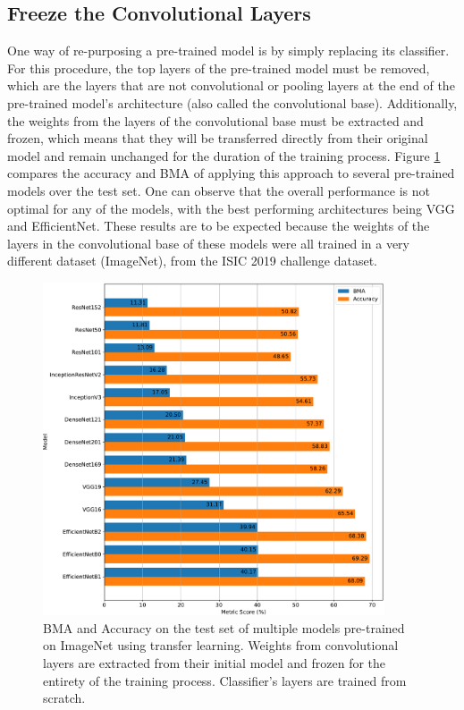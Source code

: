     \subsection{Freeze the Convolutional Layers}
    One way of re-purposing a pre-trained model is by simply replacing its classifier. For this procedure, the top layers of the pre-trained model must be removed, which are the layers that are not convolutional or pooling layers at the end of the pre-trained model's architecture (also called the convolutional base). Additionally, the weights from the layers of the convolutional base must be extracted and frozen, which means that they will be transferred directly from their original model and remain unchanged for the duration of the training process. Figure \ref{fig:pre_trained_models_classifier_comp} compares the accuracy and \ac{BMA} of applying this approach to several pre-trained models over the test set. One can observe that the overall performance is not optimal for any of the models, with the best performing architectures being VGG and EfficientNet. These results are to be expected because the weights of the layers in the convolutional base of these models were all trained in a very different dataset (ImageNet), from the \ac{ISIC} 2019 challenge dataset. \par
    \begin{figure}[ht]
        \centering
        \includegraphics[width=0.9\textwidth]{figs/pre_trained_models_classifier_comp_horizontal.pdf}
        \caption[Comparison of pre-trained models with frozen convolutional base]{\ac{BMA} and Accuracy on the test set of multiple models pre-trained on ImageNet using transfer learning. Weights from convolutional layers are extracted from their initial model and frozen for the entirety of the training process. Classifier's layers are trained from scratch.}
        \label{fig:pre_trained_models_classifier_comp}
    \end{figure}
    

